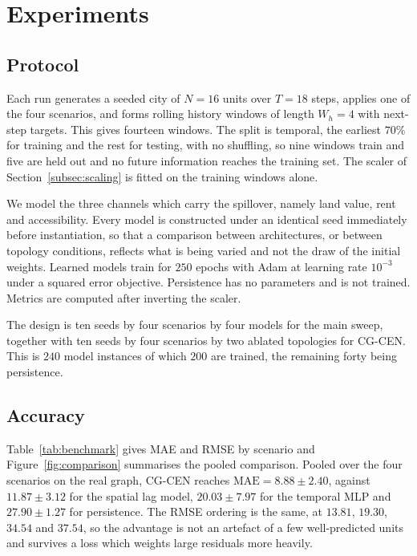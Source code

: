 \documentclass[journal]{IEEEtran}
\newcommand{\CGCEN}{CG\mbox{-}CEN}
\begin{document}
\section{Experiments}
\label{sec:experiments}

\subsection{Protocol}

Each run generates a seeded city of $N = 16$ units over $T = 18$ steps, applies
one of the four scenarios, and forms rolling history windows of length
$W_h = 4$ with next-step targets. This gives fourteen windows. The split is
temporal, the earliest $70\%$ for training and the rest for testing, with no
shuffling, so nine windows train and five are held out and no future information
reaches the training set. The scaler of Section~\ref{subsec:scaling} is fitted
on the training windows alone.

We model the three channels which carry the spillover, namely land value, rent
and accessibility. Every model is constructed under an identical seed
immediately before instantiation, so that a comparison between architectures, or
between topology conditions, reflects what is being varied and not the draw of
the initial weights. Learned models train for $250$ epochs with Adam at learning
rate $10^{-3}$ under a squared error objective. Persistence has no parameters
and is not trained. Metrics are computed after inverting the scaler.

The design is ten seeds by four scenarios by four models for the main sweep,
together with ten seeds by four scenarios by two ablated topologies for
\CGCEN{}. This is $240$ model instances of which $200$ are trained, the
remaining forty being persistence.

\subsection{Accuracy}

Table~\ref{tab:benchmark} gives MAE and RMSE by scenario and
Figure~\ref{fig:comparison} summarises the pooled comparison. Pooled over the
four scenarios on the real graph, \CGCEN{} reaches $\mathrm{MAE} = 8.88 \pm
2.40$, against $11.87 \pm 3.12$ for the spatial lag model, $20.03 \pm 7.97$ for
the temporal MLP and $27.90 \pm 1.27$ for persistence. The RMSE ordering is the
same, at $13.81$, $19.30$, $34.54$ and $37.54$, so the advantage is not an
artefact of a few well-predicted units and survives a loss which weights large
residuals more heavily.
\end{document}
